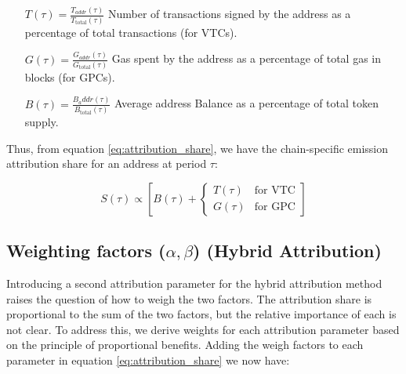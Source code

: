 \documentclass[11pt]{report}
\begin{document}
\begin{description}[leftmargin=!, labelwidth=\widthof{\bfseries Passive Behavior}]

    \item[Interactive Behavior $(I)$] \hfill
        \begin{itemize}[labelwidth=4cm, align=left, labelsep=0pt]
            \item[\( T(\tau) = \frac{T_{addr}(\tau)}{T_{\text{total}}(\tau)} \)]
                Number of transactions signed by the address as a percentage of total transactions (for VTCs).

            \item[\(G(\tau) = \frac{G_{addr}(\tau)}{G_{\text{total}}(\tau)} \)]
                Gas spent by the address as a percentage of total gas in blocks (for GPCs).
        \end{itemize}

    \item[Passive Behavior $(P)$] \hfil
        \begin{itemize}[labelwidth=4cm, align=left, labelsep=0pt]
            \item[\(B(\tau) = \frac{B_addr(\tau)}{B_{\text{total}}(\tau)} \)]
                Average address Balance as a percentage of total token supply.
        \end{itemize}

\end{description}
\parsep 5pt
Thus, from equation \eqref{eq:attribution_share}, we have the chain-specific emission attribution share for an address at period $\tau$:


\begin{equation}
    S(\tau) \propto \left[B(\tau) + \begin{cases}
            T(\tau) & \text{for VTC} \\
            G(\tau) & \text{for GPC}
        \end{cases}\right]
    \label{eq:attribution_share_chain_type}
\end{equation}

\subsection{Weighting factors ($\alpha, \beta$) (Hybrid Attribution) \label{se:weighting_factors}}

Introducing a second attribution parameter for the hybrid attribution method raises the question of how to weigh the two factors. The attribution share is proportional to the sum of the two factors, but the relative importance of each is not clear. To address this, we derive weights for each attribution parameter based on the principle of proportional benefits. Adding the weigh factors to each parameter in equation \ref{eq:attribution_share} we now have:
\end{document}
